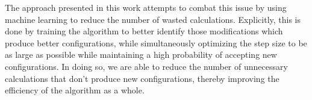 \begin{doublespace}
The approach presented in this work attempts to combat this issue by using machine learning to reduce the number of
wasted calculations.
%
Explicitly, this is done by training the algorithm to better identify those modifications which produce better
configurations, while simultaneously optimizing the step size to be as large as possible while maintaining a high
probability of accepting new configurations.
%
In doing so, we are able to reduce the number of unnecessary calculations that don't produce new configurations,
thereby improving the efficiency of the algorithm as a whole.
%
%

\end{doublespace}
